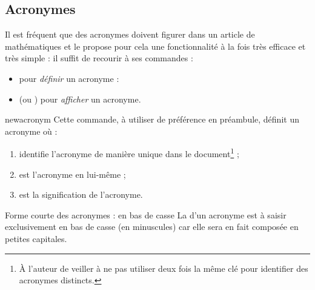 \documentclass[english,nolocaltoc]{nwejmart}
\newtheorem[style=definition]{fait}
\newtheorem[title=expérience]{experience}
\newtheorem[title-plural=anneaux]{anneau}
\newtheorem[title=idéal,title-plural=idéaux]{ideal}
\begin{document}
%

\subsection{Acronymes}
\label{sec:acronymes}

Il est fréquent que des acronymes doivent figurer dans un article de
mathématiques et le  propose pour cela une fonctionnalité
à la fois très efficace et très simple : il suffit de recourir à ses commandes :
\begin{itemize}
\item {} pour \emph{définir} un acronyme :
\item {} (ou ) pour \emph{afficher} un acronyme.
\end{itemize}

\begin{docCommand}{newacronym}{}
  Cette commande, à utiliser de préférence en préambule, définit un acronyme
  où :
  \begin{enumerate}
  \item {} identifie l'acronyme de manière unique dans le
    document\footnote{À l'auteur de veiller à ne pas utiliser deux fois la même
      clé pour identifier des acronymes distincts.} ;
  \item {} est l'acronyme en lui-même ;
  \item {} est la signification de l'acronyme.
  \end{enumerate}
\begin{dbwarning}{Forme courte des acronymes : en bas de casse}{}
  La  d'un acronyme est à saisir exclusivement en bas de
  casse (en minuscules) car elle sera en fait composée en petites capitales.
\end{dbwarning}
\end{docCommand}
\end{document}
